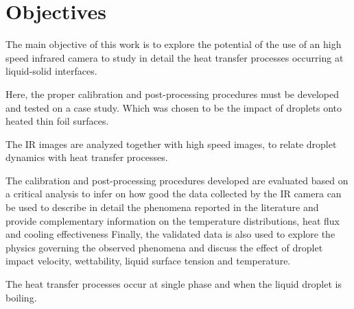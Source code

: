 \section{Objectives}
\label{sec:int_contributions}

\par The main objective of this work is to explore the potential of the use of an high speed infrared camera to study in detail the heat transfer processes occurring at liquid-solid interfaces.\\

\par Here, the proper calibration and post-processing procedures must be developed and tested on a case study. Which was chosen to be the impact of droplets onto heated thin foil surfaces.\\

\par The IR images are analyzed together with high speed images, to relate droplet dynamics with heat transfer processes.\\

\par The calibration and post-processing procedures developed are evaluated based on a critical analysis to infer on how good the data collected by the IR camera can be used to describe in detail the phenomena reported in the literature and provide complementary information on the temperature distributions, heat flux and cooling effectiveness
Finally, the validated data is also used to explore the physics governing the observed phenomena and discuss the effect of droplet impact velocity, wettability, liquid surface tension and temperature.\\

\par The heat transfer processes occur at single phase and when the liquid droplet is boiling.
